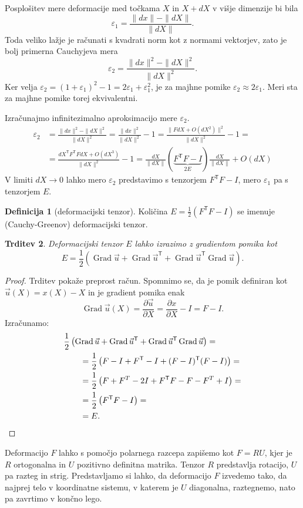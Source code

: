 \documentclass[12pt,a4paper,twoside]{article}
\theoremstyle{definition} %
\newtheorem{definicija}{Definicija}[section]
\theoremstyle{plain} %
\newtheorem{trditev}[definicija]{Trditev}
\numberwithin{equation}{section}
\newcommand{\T}{\mathsf{T}}
\newcommand{\Grad}{\operatorname{Grad}}
\newcommand{\eps}{\varepsilon}
\newcommand{\dpar}[2]{\ensuremath{\frac{\partial #1}{\partial #2}}}
\newcommand{\vu}{\vec{u}}
\newcommand{\vX}{X}
\newcommand{\vx}{x}
\begin{document}
Posplošitev mere deformacije med točkama $\vX$ in $\vX+d\vX$ v višje dimenzije bi bila
\[
  \eps_1 = \frac{\|d\vx\| - \|d\vX\|}{\|d\vX\|}.
\]
Toda veliko lažje je računati s kvadrati norm kot z normami vektorjev, zato je
bolj primerna Cauchyjeva mera
\[
  \eps_2 = \frac{\|d\vx\|^2 - \|d\vX\|^2}{\|d\vX\|^2}.
\]
Ker velja $\eps_2 = (1+\eps_1)^2 - 1 = 2\eps_1 + \eps_1^2$, je za majhne pomike
$\eps_2 \approx 2\eps_1$. Meri sta za majhne pomike torej ekvivalentni.

Izračunajmo infinitezimalno aproksimacijo mere $\eps_2$.
\begin{align*}
  \eps_2 &=
  \frac{\|d\vx\|^2 - \|d\vX\|^2}{\|d\vX\|^2} =
  \frac{\|d\vx\|^2}{\|d\vX\|^2}  - 1=
  \frac{\|F d\vX + O(d\vX^2)\|^2}{\|d\vX\|^2} - 1 = \\ &=
  \frac{d\vX^\T F^\T F d\vX + O(d\vX^3)}{\|d\vX\|^2} - 1 =
  \frac{d\vX}{\|d\vX\|}(\underbrace{F^\T F - I}_{2E})\frac{d\vX}{\|d\vX\|} + O(d\vX)
\end{align*}
V limiti $d\vX \to 0$ lahko mero $\eps_2$ predstavimo s tenzorjem $F^\T F- I$,
mero $\eps_1$ pa s tenzorjem $E$.

\begin{definicija}[deformacijski tenzor]
  Količina $E = \frac12 (F^\T F - I)$ se imenuje (Cauchy-Greenov)
  deformacijski tenzor.
\end{definicija}
\begin{trditev}
  Deformacijski tenzor $E$ lahko izrazimo z gradientom pomika kot
  \[ E = \frac12\left( \Grad \vu + \Grad \vu^\T + \Grad \vu^\T \Grad \vu \right). \]
\end{trditev}
\begin{proof}
Trditev pokaže preprost račun. Spomnimo se, da je pomik definiran kot $\vu(\vX) =
\vx(\vX) - \vX$ in je gradient pomika enak
\[
  \Grad \vu(\vX) = \dpar{\vu}{\vX} = \dpar{\vx}{\vX} - I = F - I.
\]
Izračunamo:
\begin{align*}
  &\frac12\left( \Grad \vu + \Grad \vu^\T + \Grad \vu^\T \Grad \vu \right) = \\
  &\qquad=\frac12\left(F - I + F^\T - I  + (F-I)^\T(F-I)\right) = \\
  &\qquad=\frac12\left(F + F^T - 2I + F^\T F - F - F^T + I\right) = \\
  &\qquad=\frac12\left(F^\T F - I\right) = \\
  &\qquad=E.\qedhere
\end{align*}
\end{proof}

Deformacijo $F$ lahko s pomočjo polarnega razcepa zapišemo kot $F = RU$, kjer je
$R$ ortogonalna in $U$ pozitivno definitna matrika. Tenzor $R$ predstavlja
rotacijo, $U$ pa razteg in strig. Predstavljamo si lahko, da deformacijo $F$
izvedemo tako, da najprej telo v koordinatne sistemu, v katerem je $U$ diagonalna,
raztegnemo, nato pa zavrtimo v končno lego.
\end{document}
